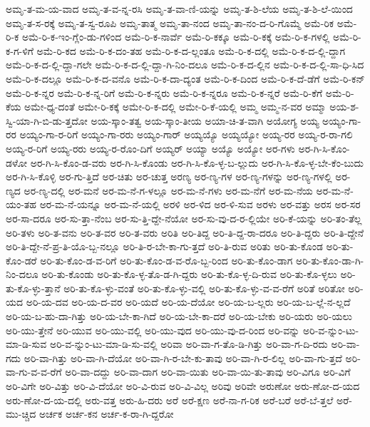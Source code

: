 {ಅಮೃ-ತ-ಮ-ಯ-ವಾದ
ಅಮೃ-ತ-ವ-ನ್ನ-ರಸಿ
ಅಮೃ-ತ-ವಾ-ಣಿ-ಯನ್ನು
ಅಮೃ-ತ-ಶಿ-ಲೆಯ
ಅಮೃ-ತ-ಶಿ-ಲೆ-ಯಿಂದ
ಅಮೃ-ತ-ಸ-ರಕ್ಕೆ
ಅಮೃ-ತ-ಸ್ವ-ರೂಪಿ
ಅಮೃ-ತಾತ್ಮ
ಅಮೃ-ತಾ-ನಂದ
ಅಮೃ-ತಾ-ನಂ-ದ-ರಿ-ಗೊಮ್ಮೆ
ಅಮೆ-ರಿಕ
ಅಮೆ-ರಿ-ಕ
ಅಮೆ-ರಿ-ಕ-ಇಂ-ಗ್ಲೆಂ-ಡು-ಗಳಿಂದ
ಅಮೆ-ರಿ-ಕ-ನಾರ್ವೆ
ಅಮೆ-ರಿ-ಕಕ್ಕೂ
ಅಮೆ-ರಿ-ಕಕ್ಕೆ
ಅಮೆ-ರಿ-ಕ-ಗಳಲ್ಲಿ
ಅಮೆ-ರಿ-ಕ-ಗ-ಳಿಗೆ
ಅಮೆ-ರಿ-ಕದ
ಅಮೆ-ರಿ-ಕ-ದಂ-ತಹ
ಅಮೆ-ರಿ-ಕ-ದ-ಲ್ಲಂತೂ
ಅಮೆ-ರಿ-ಕ-ದಲ್ಲಿ
ಅಮೆ-ರಿ-ಕ-ದ-ಲ್ಲಿ-ದ್ದಾಗ
ಅಮೆ-ರಿ-ಕ-ದ-ಲ್ಲಿ-ದ್ದಾ-ಗಲೇ
ಅಮೆ-ರಿ-ಕ-ದ-ಲ್ಲಿ-ದ್ದಾ-ಗಿ-ನಿಂ-ದಲೂ
ಅಮೆ-ರಿ-ಕ-ದ-ಲ್ಲಿನ
ಅಮೆ-ರಿ-ಕ-ದ-ಲ್ಲಿ-ಸಾ-ಧಿ-ಸಿದ
ಅಮೆ-ರಿ-ಕ-ದಲ್ಲೂ
ಅಮೆ-ರಿ-ಕ-ದ-ವನೊ
ಅಮೆ-ರಿ-ಕ-ದಾ-ದ್ಯಂತ
ಅಮೆ-ರಿ-ಕ-ದಿಂದ
ಅಮೆ-ರಿ-ಕ-ದೆ-ಡೆಗೆ
ಅಮೆ-ರಿ-ಕನ್
ಅಮೆ-ರಿ-ಕ-ನ್ನರ
ಅಮೆ-ರಿ-ಕ-ನ್ನ-ರಿಗೆ
ಅಮೆ-ರಿ-ಕ-ನ್ನರು
ಅಮೆ-ರಿ-ಕ-ನ್ನರೂ
ಅಮೆ-ರಿ-ಕ-ನ್ನರೆ
ಅಮೆ-ರಿ-ಕೆಗೆ
ಅಮೆ-ರಿ-ಕೆಯ
ಅಮೇ-ಧ್ಯ-ದಂತೆ
ಅಮೇ-ರಿ-ಕಕ್ಕೆ
ಅಮೇ-ರಿ-ಕ-ದಲ್ಲಿ
ಅಮೇ-ರಿ-ಕೆ-ಯಲ್ಲಿ
ಅಮ್ಮ
ಅಮ್ಮ-ನ-ವರ
ಅಮ್ಮಾ
ಅಯ-ಶ-ಸ್ವಿ-ಯಾ-ಗಿ-ಬಿ-ಡು-ತ್ತದೋ
ಅಯ-ಸ್ಕಾಂ-ತತ್ವ
ಅಯ-ಸ್ಕಾಂ-ತೀಯ
ಅಯಾ-ಚಿ-ತ-ವಾಗಿ
ಅಯೋಗ್ಯ
ಅಯ್ಯ
ಅಯ್ಯಂ-ಗಾ-ರರ
ಅಯ್ಯಂ-ಗಾ-ರ-ರಿಗೆ
ಅಯ್ಯಂ-ಗಾ-ರರು
ಅಯ್ಯಂ-ಗಾರ್
ಅಯ್ಯಯ್ಯೊ
ಅಯ್ಯಯ್ಯೋ
ಅಯ್ಯ-ರರ
ಅಯ್ಯ-ರ-ರಾ-ಗಲಿ
ಅಯ್ಯ-ರ-ರಿಗೆ
ಅಯ್ಯ-ರರು
ಅಯ್ಯ-ರ-ರೊಂ-ದಿಗೆ
ಅಯ್ಯರ್
ಅಯ್ಯಾ
ಅಯ್ಯೊ
ಅಯ್ಯೋ
ಅರ-ಗಳು
ಅರ-ಗಿ-ಸಿ-ಕೊಂ-ಡಳೋ
ಅರ-ಗಿ-ಸಿ-ಕೊಂ-ಡ-ವರು
ಅರ-ಗಿ-ಸಿ-ಕೊಂಡು
ಅರ-ಗಿ-ಸಿ-ಕೊ-ಳ್ಳ-ಬ-ಲ್ಲುದು
ಅರ-ಗಿ-ಸಿ-ಕೊ-ಳ್ಳ-ಬೇ-ಕೆಂ-ಬುದು
ಅರ-ಗಿ-ಸಿ-ಕೊಳ್ಳಿ
ಅರ-ಗು-ತ್ತಿದೆ
ಅರ-ಚಿತು
ಅರ-ಚುತ್ತ
ಅರಣ್ಯ
ಅರ-ಣ್ಯ-ಗಳ
ಅರ-ಣ್ಯ-ಗಳನ್ನು
ಅರ-ಣ್ಯ-ಗಳಲ್ಲಿ
ಅರ-ಣ್ಯದ
ಅರ-ಣ್ಯ-ದಲ್ಲಿ
ಅರ-ಮನೆ
ಅರ-ಮ-ನೆ-ಗ-ಳಲ್ಲೂ
ಅರ-ಮ-ನೆ-ಗಳು
ಅರ-ಮ-ನೆಗೆ
ಅರ-ಮ-ನೆಯ
ಅರ-ಮ-ನೆ-ಯಂ-ತಹ
ಅರ-ಮ-ನೆ-ಯನ್ನೂ
ಅರ-ಮ-ನೆ-ಯಲ್ಲಿ
ಅರಳಿ
ಅರ-ಳಿದ
ಅರ-ಳಿ-ಸುವ
ಅರಳು
ಅರ-ವತ್ತು
ಅರಸ
ಅರ-ಸರ
ಅರ-ಸಾ-ದರೂ
ಅರ-ಸು-ತ್ತಾ-ನೆಂಬ
ಅರ-ಸು-ತ್ತಿ-ದ್ದೇ-ನೆಯೋ
ಅರ-ಸು-ವು-ದ-ರ-ಲ್ಲಿಯೇ
ಅರಿ-ಕೆ-ಯನ್ನು
ಅರಿ-ತಂ-ತೆಲ್ಲ
ಅರಿ-ತಳು
ಅರಿ-ತ-ವನು
ಅರಿ-ತ-ವರ
ಅರಿ-ತ-ವರು
ಅರಿತಿ
ಅರಿ-ತಿದ್ದ
ಅರಿ-ತಿ-ದ್ದ-ರಾ-ದರೂ
ಅರಿ-ತಿ-ದ್ದರು
ಅರಿ-ತಿ-ದ್ದೇನೆ
ಅರಿ-ತಿ-ದ್ದೇ-ನೆ-ಪ್ರ-ತಿ-ಯೊ-ಬ್ಬ-ನಲ್ಲೂ
ಅರಿ-ತಿ-ರ-ಬೇ-ಕಾ-ಗು-ತ್ತದೆ
ಅರಿ-ತಿ-ರುವ
ಅರಿತು
ಅರಿ-ತು-ಕೊಂಡ
ಅರಿ-ತು-ಕೊಂ-ಡರೆ
ಅರಿ-ತು-ಕೊಂ-ಡ-ವ-ರಿಗೆ
ಅರಿ-ತು-ಕೊಂ-ಡ-ವ-ರೊ-ಬ್ಬ-ರಿಂದ
ಅರಿ-ತು-ಕೊಂ-ಡಾಗ
ಅರಿ-ತು-ಕೊಂ-ಡಾ-ಗಿ-ನಿಂ-ದಲೂ
ಅರಿ-ತು-ಕೊಂಡು
ಅರಿ-ತು-ಕೊ-ಳ್ಳ-ತೊ-ಡ-ಗಿ-ದ್ದರು
ಅರಿ-ತು-ಕೊ-ಳ್ಳ-ದಿ-ರುವ
ಅರಿ-ತು-ಕೊ-ಳ್ಳಲು
ಅರಿ-ತು-ಕೊ-ಳ್ಳು-ತ್ತಾನೆ
ಅರಿ-ತು-ಕೊ-ಳ್ಳು-ವಂತೆ
ಅರಿ-ತು-ಕೊ-ಳ್ಳು-ವಲ್ಲಿ
ಅರಿ-ತು-ಕೊ-ಳ್ಳು-ವ-ವ-ರೆಗೆ
ಅರಿತೆ
ಅರಿತೋ
ಅರಿ-ಯದ
ಅರಿ-ಯ-ದವ
ಅರಿ-ಯ-ದ-ವರ
ಅರಿ-ಯದೆ
ಅರಿ-ಯ-ದೆಯೋ
ಅರಿ-ಯ-ಬ-ಲ್ಲರು
ಅರಿ-ಯ-ಬ-ಲ್ಲೆ-ನ-ಲ್ಲದೆ
ಅರಿ-ಯ-ಬ-ಹು-ದಾ-ಗಿತ್ತು
ಅರಿ-ಯ-ಬೇ-ಕಾ-ಗಿದೆ
ಅರಿ-ಯ-ಬೇ-ಕಾ-ದರೆ
ಅರಿ-ಯ-ಬೇಕು
ಅರಿ-ಯರು
ಅರಿ-ಯಲು
ಅರಿ-ಯು-ತ್ತೇನೆ
ಅರಿ-ಯುವ
ಅರಿ-ಯು-ವಲ್ಲಿ
ಅರಿ-ಯು-ವುದ
ಅರಿ-ಯು-ವು-ದ-ರಿಂದ
ಅರಿ-ವನ್ನು
ಅರಿ-ವ-ನ್ನುಂ-ಟು-ಮಾ-ಡಿ-ಸುವ
ಅರಿ-ವ-ನ್ನುಂ-ಟು-ಮಾ-ಡಿ-ಸು-ವಲ್ಲಿ
ಅರಿವಾ
ಅರಿ-ವಾ-ಗ-ತೊ-ಡಿ-ಗಿತ್ತು
ಅರಿ-ವಾ-ಗ-ದಿ-ರದು
ಅರಿ-ವಾ-ಗದು
ಅರಿ-ವಾ-ಗಿತ್ತು
ಅರಿ-ವಾ-ಗಿ-ದೆಯೋ
ಅರಿ-ವಾ-ಗಿ-ರ-ಬೇ-ಕು-ತಾವು
ಅರಿ-ವಾ-ಗಿ-ರ-ಲಿಲ್ಲ
ಅರಿ-ವಾ-ಗು-ತ್ತದೆ
ಅರಿ-ವಾ-ಗು-ವ-ವ-ರೆಗೆ
ಅರಿ-ವಾ-ದದ್ದು
ಅರಿ-ವಾ-ದಾಗ
ಅರಿ-ವಾ-ಯಿತು
ಅರಿ-ವಾ-ಯಿ-ತು-ತಾವು
ಅರಿ-ವಿಗೂ
ಅರಿ-ವಿಗೆ
ಅರಿ-ವಿಗೇ
ಅರಿ-ವಿತ್ತು
ಅರಿ-ವಿ-ದೆಯೋ
ಅರಿ-ವಿ-ರುವ
ಅರಿ-ವಿ-ವಿಲ್ಲ
ಅರಿವು
ಅರಿವೇ
ಅರುಣೋ
ಅರು-ಣೋ-ದ-ಯದ
ಅರು-ಣೋ-ದ-ಯ-ದಲ್ಲಿ
ಅರು-ವತ್ತ
ಅರು-ಹಿ-ದರು
ಅರೆ
ಅರೆ-ಕ್ಷಣ
ಅರೆ-ನಾ-ಗ-ರಿಕ
ಅರೆ-ಬರೆ
ಅರೆ-ಬೆ-ತ್ತಲೆ
ಅರೆ-ಮು-ಚ್ಚಿದ
ಅರ್ಚಕ
ಅರ್ಚ-ಕನ
ಅರ್ಚ-ಕ-ರಾ-ಗಿ-ದ್ದರೋ
}
